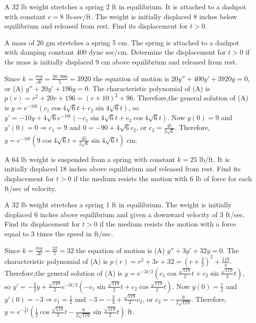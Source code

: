 \documentclass{ximera}
\begin{document}
\begin{problem}\label{exer:6.2.7}
A 32 lb weight stretches a spring 2 ft in equilibrium. It is attached
to a dashpot with constant $c=8$ lb-sec/ft. The weight is initially
displaced 8 inches below equilibrium and released from rest. Find its
displacement for $t>0$.
\end{problem}

\begin{problem}\label{exer:6.2.8}
  A mass of 20 gm stretches a  spring 5 cm.  The spring
is attached to a dashpot with damping constant 400 dyne sec/cm.  Determine
the displacement for $t>0$ if the mass is  initially displaced
 9 cm  above equilibrium  and released from rest.

 \begin{solution}
     Since $k=\frac{mg}{\Delta l}=\frac{20\cdot980}{5}=3920$ the
equation of motion is $20y''+400y'+3920y=0$, or (A) $y''+20y'+196y=0$.
The characteristic polynomial of (A) is
$p(r)=r^2+20r+196=(r+10)^2+96$. Therefore,the general solution of (A)
is $y=e^{-10t}(c_1\cos4\sqrt6t+c_2\sin4\sqrt6t)$, so
$y'=-10y+4\sqrt6e^{-10t}(-c_1\sin4\sqrt6t+c_2\cos4\sqrt6t)$. Now
$y(0)=9$ and $y'(0)=0\Rightarrow c_1=9$ and $0=-90+4\sqrt6c_2$, or
$c_2=\frac{45}{2\sqrt6}$. Therefore,
$y=e^{-10t}\left(9\cos4\sqrt{6}t+\frac{45}{2\sqrt{6}}\sin4\sqrt{6}
t\right)$ cm.
 \end{solution}
\end{problem}

\begin{problem}\label{exer:6.2.9}
A 64 lb weight is suspended from a spring with constant $k=25$ lb/ft.
It is initially displaced 18 inches above equilibrium and released
from rest. Find its displacement for $t>0$ if the medium resists the
motion with 6 lb of force for each ft/sec of velocity.
\end{problem}

\begin{problem}\label{exer:6.2.10}
A 32 lb weight stretches a spring 1 ft in equilibrium. The weight is
initially displaced 6 inches above equilibrium and given a downward
velocity of 3 ft/sec. Find its displacement for $t>0$ if the medium
resists the motion with a force  equal to 3 times the speed
in ft/sec.

\begin{solution}
Since $k=\frac{mg}{\Delta l}=\frac{32}{1}=32$ the equation of
motion is (A) $y''+3y'+32y=0$. The characteristic polynomial of (A) is
$p(r)=r^2+3r+32=\left(r+\frac{3}{2}\right)^2+\frac{119}{4}$.
Therefore,the general solution of (A) is
$y=e^{-3t/2}\left(c_1\cos\frac{\sqrt{119}}{2}t
+c_2\sin\frac{\sqrt{119}}{2}t\right)$, so $y'=-\frac{3}{2}y+
\frac{\sqrt{119}}{2}e^{-3t/2}
\left(-c_1\sin\frac{\sqrt{119}}{2}t+c_2\cos\frac{\sqrt{119}}{2}t\right)$.
Now $y(0)=\frac{1}{2}$ and $y'(0)=-3\Rightarrow c_1=\frac{1}{2}$
and $-3=-\frac{3}{4}+\frac{\sqrt{119}}{2}c_2$, or
$c_2=-\frac{9}{2\sqrt{119}}$. Therefore,
$y=e^{-\frac{3}{2}t}\left(\frac{1}{2}\cos \frac{\sqrt{119}}{2} t
-\frac{9}{2\sqrt{119}}\sin\frac{\sqrt{119}}{2}t\right)$ ft.
\end{solution}
\end{problem}
\end{document}
